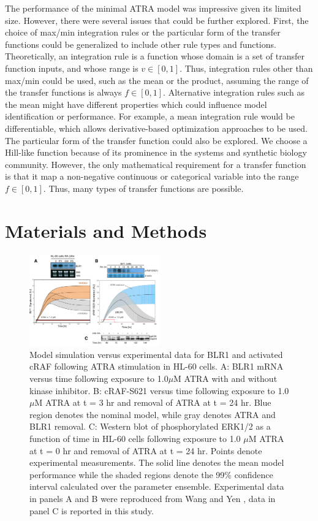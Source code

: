 \documentclass[10pt,twocolumn,twoside,final]{IEEEtran}
\begin{document}
The performance of the minimal ATRA model was impressive given its limited size. However, there were several issues that could be further explored.
First, the choice of max/min integration rules or the particular form of the transfer functions could be generalized to include other rule types and functions.
Theoretically, an integration rule is a function whose domain is a set of transfer function inputs, and whose range is $v\in[0,1]$.
Thus, integration rules other than max/min could be used, such as the mean or the product, assuming the range of the transfer functions is always $f\in[0,1]$.
Alternative integration rules such as the mean might have different properties which could influence model identification or performance.
For example, a mean integration rule would be differentiable, which allows derivative-based optimization approaches to be used.
The particular form of the transfer function could also be explored. We choose a Hill-like function because of its
prominence in the systems and synthetic biology community. However, the only mathematical requirement for a transfer function is that it map a non-negative continuous or categorical variable into the range $f\in[0,1]$. Thus, many types of transfer functions are possible.

\section{Materials and Methods}

\begin{figure}[!t]\centering
\includegraphics[width=0.50\textwidth]{./figs/Fig-4-Predictions.pdf}
\caption{Model simulation versus experimental data for BLR1 and activated cRAF following ATRA stimulation in HL-60 cells. A: BLR1 mRNA versus time following exposure to 1.0$\mu$M ATRA with and without kinase inhibitor. B: cRAF-S621 versus time following exposure to 1.0$\mu$M ATRA at t = 3 hr and removal of ATRA at t = 24 hr. Blue region denotes the nominal model, while gray denotes ATRA and BLR1 removal. C: Western blot of phosphorylated ERK1/2 as a function of time in HL-60 cells following exposure to 1.0 $\mu$M ATRA at t = 0 hr and removal of ATRA at t = 24 hr. Points denote experimental measurements. The solid line denotes the mean model performance while the shaded regions denote the 99\% confidence interval calculated over the parameter ensemble. Experimental data in panels A and B were reproduced from Wang and Yen \cite{Wang2008}, data in panel C is reported in this study. }\label{fig:model-predictions}
\end{figure}
\end{document}
